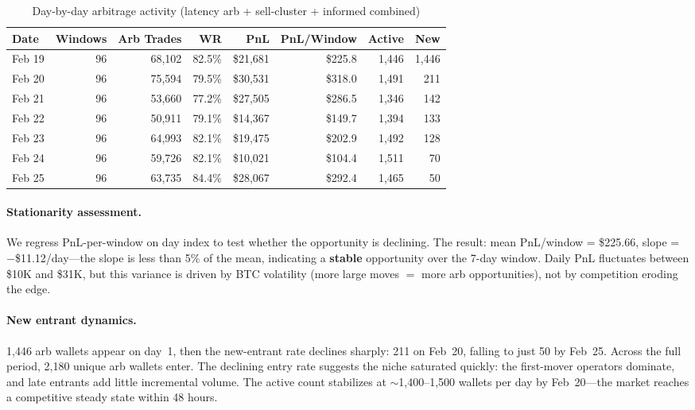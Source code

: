 \documentclass[11pt,a4paper]{article}
\begin{document}
\begin{table}[H]
\centering
\caption{Day-by-day arbitrage activity (latency arb + sell-cluster + informed combined)}
\label{tab:temporal}
\small
\begin{tabular}{@{}lrrrrrrr@{}}
\toprule
\textbf{Date} & \textbf{Windows} & \textbf{Arb Trades} & \textbf{WR} & \textbf{PnL} & \textbf{PnL/Window} & \textbf{Active} & \textbf{New} \\
\midrule
Feb 19 & 96 & 68,102  & 82.5\% & \$21,681 & \$225.8 & 1,446 & 1,446 \\
Feb 20 & 96 & 75,594  & 79.5\% & \$30,531 & \$318.0 & 1,491 & 211 \\
Feb 21 & 96 & 53,660  & 77.2\% & \$27,505 & \$286.5 & 1,346 & 142 \\
Feb 22 & 96 & 50,911  & 79.1\% & \$14,367 & \$149.7 & 1,394 & 133 \\
Feb 23 & 96 & 64,993  & 82.1\% & \$19,475 & \$202.9 & 1,492 & 128 \\
Feb 24 & 96 & 59,726  & 82.1\% & \$10,021 & \$104.4 & 1,511 & 70 \\
Feb 25 & 96 & 63,735  & 84.4\% & \$28,067 & \$292.4 & 1,465 & 50 \\
\bottomrule
\end{tabular}
\end{table}

\paragraph{Stationarity assessment.} We regress PnL-per-window on day index to test whether the opportunity is declining. The result: mean PnL/window = \$225.66, slope = $-$\$11.12/day---the slope is less than 5\% of the mean, indicating a \textbf{stable} opportunity over the 7-day window.  Daily PnL fluctuates between \$10K and \$31K, but this variance is driven by BTC volatility (more large moves $=$ more arb opportunities), not by competition eroding the edge.

\paragraph{New entrant dynamics.} 1,446 arb wallets appear on day~1, then the new-entrant rate declines sharply: 211 on Feb~20, falling to just 50 by Feb~25. Across the full period, 2,180 unique arb wallets enter. The declining entry rate suggests the niche saturated quickly: the first-mover operators dominate, and late entrants add little incremental volume. The active count stabilizes at $\sim$1,400--1,500 wallets per day by Feb~20---the market reaches a competitive steady state within 48 hours.
\end{document}
